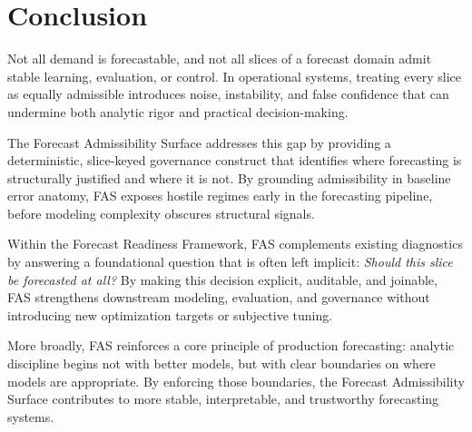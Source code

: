 
\section{Conclusion}
\label{sec:fas_conclusion}

Not all demand is forecastable, and not all slices of a forecast domain admit
stable learning, evaluation, or control. In operational systems, treating every
slice as equally admissible introduces noise, instability, and false confidence
that can undermine both analytic rigor and practical decision-making.

The Forecast Admissibility Surface addresses this gap by providing a
deterministic, slice-keyed governance construct that identifies where forecasting
is structurally justified and where it is not. By grounding admissibility in
baseline error anatomy, FAS exposes hostile regimes early in the forecasting
pipeline, before modeling complexity obscures structural signals.

Within the Forecast Readiness Framework, FAS complements existing diagnostics by
answering a foundational question that is often left implicit: \emph{Should this
slice be forecasted at all?} By making this decision explicit, auditable, and
joinable, FAS strengthens downstream modeling, evaluation, and governance without
introducing new optimization targets or subjective tuning.

More broadly, FAS reinforces a core principle of production forecasting: analytic
discipline begins not with better models, but with clear boundaries on where
models are appropriate. By enforcing those boundaries, the Forecast Admissibility
Surface contributes to more stable, interpretable, and trustworthy forecasting
systems.
